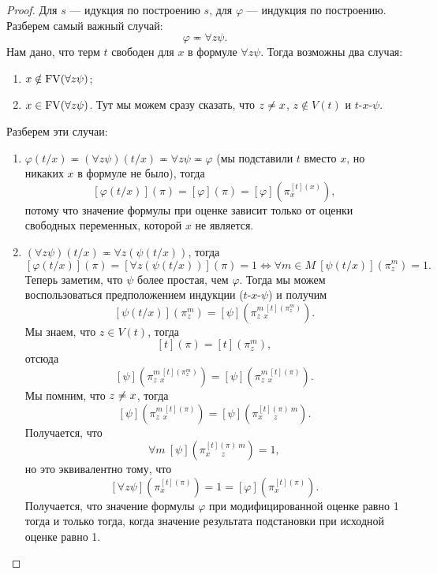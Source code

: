 \begin{proof}
    Для $s$ --- идукция по построению $s$, для $\varphi$ --- индукция по построению.
    Разберем самый важный случай:
    $$
        \varphi \eqcirc \forall z \psi.
    $$
    Нам дано, что терм $t$ свободен для $x$ в формуле $\forall z \psi$.
    Тогда возможны два случая:
    \begin{enumerate}
        \item $x \notin \mathrm{FV}(\forall z \psi)$;
        \item $x \in \mathrm{FV}(\forall z \psi)$.
        Тут мы можем сразу сказать, что $z \centernot \eqcirc x$, $z \notin V(t)$ и $t$-$x$-$\psi$.
    \end{enumerate}
    Разберем эти случаи:
    \begin{enumerate}
        \item $\varphi(t/x) \eqcirc (\forall z \psi)(t/x) \eqcirc \forall z \psi \eqcirc \varphi$ (мы подставили $t$ вместо $x$, но никаких $x$ в формуле не было), тогда
        $$
            [\varphi(t/x)](\pi) = [\varphi](\pi) = [\varphi](\pi_{x}^{[t](x)}),
        $$
        потому что значение формулы при оценке зависит только от оценки свободных переменных, которой $x$ не является.
        \item $(\forall z \psi)(t/x) \eqcirc \forall z (\psi(t/x))$, тогда
        $$
            [\varphi(t/x)](\pi) = [\forall z (\psi(t/x))](\pi) = 1 \iff \forall m \in M~ [\psi(t/x)](\pi_{z}^{m}) = 1.
        $$
        Теперь заметим, что $\psi$ более простая, чем $\varphi$.
        Тогда мы можем воспользоваться предположением индукции ($t$-$x$-$\psi$) и получим
        $$
            [\psi(t/x)](\pi_{z}^{m}) = [\psi](\pi_{z~~x}^{m~[t](\pi_{z}^{m})}).
        $$
        Мы знаем, что $z \in V(t)$, тогда
        $$
            [t](\pi) = [t](\pi_{z}^{m}),
        $$
        отсюда
        $$
            [\psi](\pi_{z~~x}^{m~[t](\pi_{z}^{m})}) = [\psi](\pi_{z~~x}^{m~[t](\pi)}).
        $$
        Мы помним, что $z \centernot\eqcirc x$, тогда
        $$
            [\psi](\pi_{z~~x}^{m~[t](\pi)}) = [\psi](\pi_{x\quad~~z}^{[t](\pi)~m}).
        $$
        Получается, что
        $$
            \forall m~[\psi](\pi_{x\quad~~z}^{[t](\pi)~m}) = 1,
        $$
        но это эквивалентно тому, что
        $$
            [\forall z \psi](\pi_{x}^{[t](\pi)}) = 1 = [\varphi](\pi_{x}^{[t](\pi)}).
        $$
        Получается, что значение формулы $\varphi$ при модифицированной оценке равно 1 тогда и только тогда, когда значение результата подстановки при исходной оценке равно 1.
    \end{enumerate}
\end{proof}

